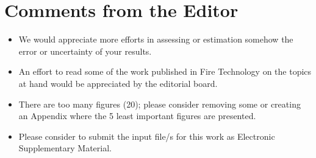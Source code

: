 \documentclass[12pt]{article}
\begin{document}
\section{Comments from the Editor}
\begin{itemize}
\item We would appreciate more efforts in assessing or estimation somehow the error or uncertainty of your results.
\item An effort to read some of the work published in Fire Technology on the topics at hand would be appreciated by the editorial board.
\item There are too many figures (20); please consider removing some or creating an Appendix where the 5 least important figures are presented.
\item Please consider to submit the input file/s for this work as Electronic Supplementary Material.
\end{itemize}
\end{document}
